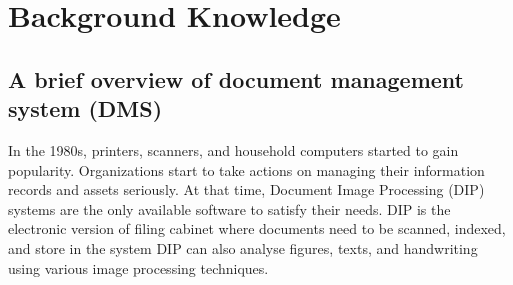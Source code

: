 \chapter{Background Knowledge}

\section{A brief overview of document management system (DMS)}
In the 1980s, printers, scanners, and household computers started to gain popularity.
Organizations start to take actions on managing their information records and assets seriously.
At that time, Document Image Processing (DIP) systems are the only available software to satisfy their needs.
DIP is the electronic version of filing cabinet where documents need to be scanned, indexed, and store in the system %
DIP can also analyse figures, texts, and handwriting using various image processing techniques.

